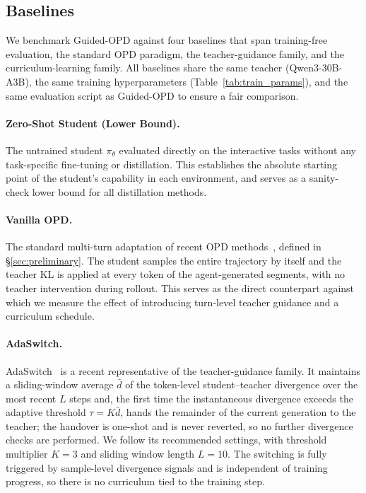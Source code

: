 \documentclass[11pt]{article}
\begin{document}
\subsection{Baselines}
\label{app:baselines}

We benchmark Guided-OPD against four baselines that span training-free evaluation, the standard OPD paradigm, the teacher-guidance family, and the curriculum-learning family. All baselines share the same teacher (Qwen3-30B-A3B), the same training hyperparameters (Table~\ref{tab:train_params}), and the same evaluation script as Guided-OPD to ensure a fair comparison.

\paragraph{Zero-Shot Student (Lower Bound).}
The untrained student $\pi_\theta$ evaluated directly on the interactive tasks without any task-specific fine-tuning or distillation. This establishes the absolute starting point of the student's capability in each environment, and serves as a sanity-check lower bound for all distillation methods.

\paragraph{Vanilla OPD.}
The standard multi-turn adaptation of recent OPD methods~\citep{opd, lu2025onpolicydistillation}, defined in \S\ref{sec:preliminary}. The student samples the entire trajectory by itself and the teacher KL is applied at every token of the agent-generated segments, with no teacher intervention during rollout. This serves as the direct counterpart against which we measure the effect of introducing turn-level teacher guidance and a curriculum schedule.

\paragraph{AdaSwitch.}
AdaSwitch~\citep{AdaSwitch} is a recent representative of the teacher-guidance family. 
It maintains a sliding-window average $\bar{d}$ of the token-level student--teacher divergence over the most recent $L$ steps and, the first time the instantaneous divergence exceeds the adaptive threshold $\tau = K\bar{d}$, hands the remainder of the current generation to the teacher; the handover is one-shot and is never reverted, so no further divergence checks are performed. 
We follow its recommended settings, with threshold multiplier $K = 3$ and sliding window length $L = 10$. 
The switching is fully triggered by sample-level divergence signals and is independent of training progress, so there is no curriculum tied to the training step.
\end{document}
